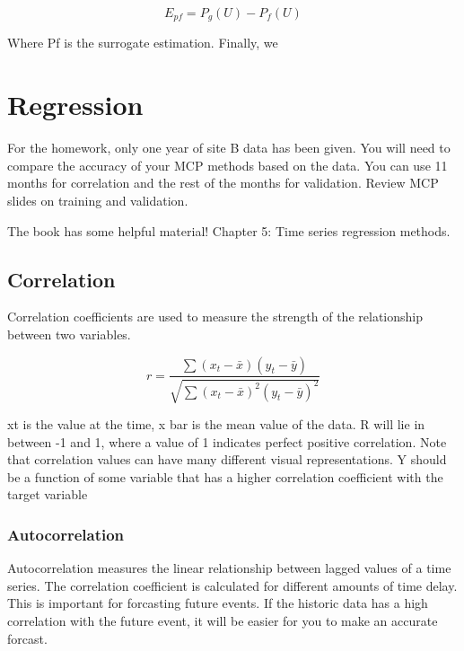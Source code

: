 \documentclass[12pt, a4paper]{report}
\begin{document}
  \begin{equation}
    E_{pf} = P_g(U) - P_f(U)
  \end{equation}

  Where Pf is the surrogate estimation. Finally, we











  \chapter{Regression}

  For the homework, only one year of site B data has been given. You will need to compare the accuracy of your MCP methods based on the data. You can use 11 months for correlation and the rest of the months for validation. Review MCP slides on training and validation.

  The book has some helpful material! Chapter 5: Time series regression methods.

  \section{Correlation}

  Correlation coefficients are used to measure the strength of the relationship between two variables.

  \begin{equation}
    r = \frac{\sum (x_t - \bar x)(y_t - \bar y)}{\sqrt{\sum (x_t - \bar x)^2(y_t - \bar y)^2}}
  \end{equation}

  xt is the value at the time, x bar is the mean value of the data. R will lie in between -1 and 1, where a value of 1 indicates perfect positive correlation. Note that correlation values can have many different visual representations. Y should be a function of some variable that has a higher correlation coefficient with the target variable

  \subsection{Autocorrelation}

  Autocorrelation measures the linear relationship between lagged values of a time series. The correlation coefficient is calculated for different amounts of time delay. This is important for forcasting future events. If the historic data has a high correlation with the future event, it will be easier for you to make an accurate forcast.
\end{document}
